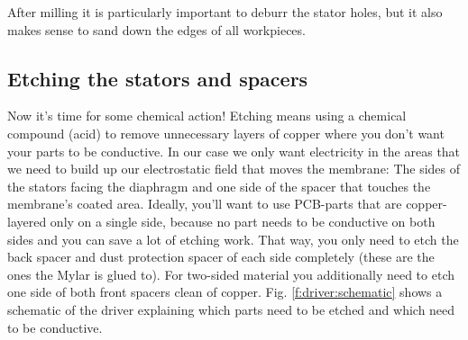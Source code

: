 \documentclass{article}
\begin{document}
After milling it is particularly important to deburr the stator holes, but it also makes sense to sand down the edges of all workpieces.

%
%
%
%

\subsection{Etching the stators and spacers}
\label{s:driver:etching}
Now it's time for some chemical action! Etching means using a chemical compound (acid) to remove unnecessary layers of copper where you don't want your parts to be conductive. In our case we only want electricity in the areas that we need to build up our electrostatic field that moves the membrane: The sides of the stators facing the diaphragm and one side of the spacer that touches the membrane's coated area. 
Ideally, you'll want to use PCB-parts that are copper-layered only on a single side, because no part needs to be conductive on both sides and you can save a lot of etching work. That way, you only need to etch the back spacer and dust protection spacer of each side completely (these are the ones the Mylar is glued to). For two-sided material you additionally need to etch one side of both front spacers clean of copper. Fig. \ref{f:driver:schematic} shows a schematic of the driver explaining which parts need to be etched and which need to be conductive.
\end{document}
